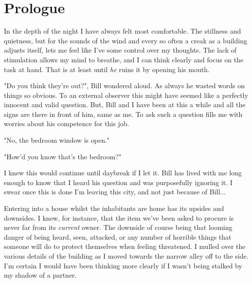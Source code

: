 \chapter*{Prologue} 


In the depth of the night I have always felt most comfortable. The stillness and
quietness, but for the sounds of the wind and every so often a creak as a
building adjusts itself, lets me feel like I've some control over my thoughts.
The lack of stimulation allows my mind to breathe, and I can think clearly and
focus on the task at hand. That is at least until \textit{he} ruins it by
opening his mouth. 

\begin{dialogue}
    \item{"Do you think they're out?", Bill wondered aloud. As always he wasted
    words on things so obvious.
    To an external observer this might have seemed like a perfectly innocent and valid
    question. But, Bill and I have been at this a while and all the signs are
    there in front of him, same as me. To ask such a question fills me with
    worries about his competence for this job.}
    \item {"No, the bedroom window is open."}
    \item {"How'd you know that's the bedroom?"}
\end{dialogue}

I knew this would continue until daybreak if I let it. Bill has lived with me
long enough to know that I heard his question and was purposefully ignoring it.
I swear once this is done I'm leaving this city, and not just because of Bill...

Entering into a house whilst the inhabitants are home has its upsides and
downsides. I knew, for instance, that the item we've been asked to procure is
never far from its \textit{current} owner. The downside of course being that
looming danger of being heard, seen, attacked, or any number of horrible things
that someone will do to protect themselves when feeling threatened. I mulled
over the various details of the building as I moved towards the narrow alley off
to the side. I'm certain I would have been thinking more clearly if I wasn't
being stalked by my shadow of a partner.

